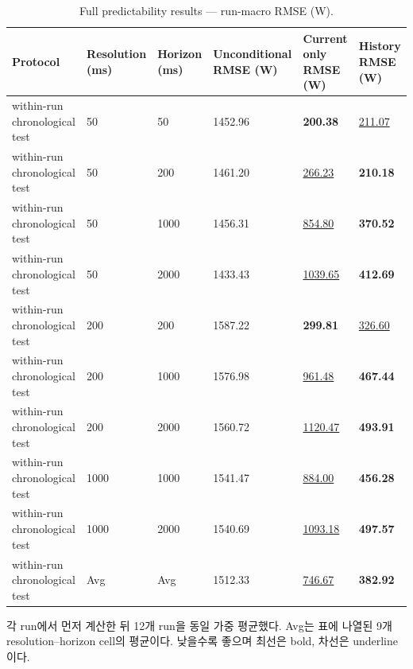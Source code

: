 \begin{table}[t]
\centering
\caption{Full predictability results — run-macro RMSE (W).}
\label{tab:a2c_predictability_rmse}
\small
\begin{tabular}{llllll}
\toprule
Protocol & Resolution (ms) & Horizon (ms) & Unconditional RMSE (W) & Current only RMSE (W) & History RMSE (W) \\
\midrule
within-run chronological test & 50 & 50 & 1452.96 & \textbf{200.38} & \underline{211.07} \\
within-run chronological test & 50 & 200 & 1461.20 & \underline{266.23} & \textbf{210.18} \\
within-run chronological test & 50 & 1000 & 1456.31 & \underline{854.80} & \textbf{370.52} \\
within-run chronological test & 50 & 2000 & 1433.43 & \underline{1039.65} & \textbf{412.69} \\
within-run chronological test & 200 & 200 & 1587.22 & \textbf{299.81} & \underline{326.60} \\
within-run chronological test & 200 & 1000 & 1576.98 & \underline{961.48} & \textbf{467.44} \\
within-run chronological test & 200 & 2000 & 1560.72 & \underline{1120.47} & \textbf{493.91} \\
within-run chronological test & 1000 & 1000 & 1541.47 & \underline{884.00} & \textbf{456.28} \\
within-run chronological test & 1000 & 2000 & 1540.69 & \underline{1093.18} & \textbf{497.57} \\
within-run chronological test & Avg & Avg & 1512.33 & \underline{746.67} & \textbf{382.92} \\
\bottomrule
\end{tabular}
\vspace{2pt}\par\footnotesize 각 run에서 먼저 계산한 뒤 12개 run을 동일 가중 평균했다. Avg는 표에 나열된 9개 resolution–horizon cell의 평균이다. 낮을수록 좋으며 최선은 bold, 차선은 underline이다.
\end{table}

